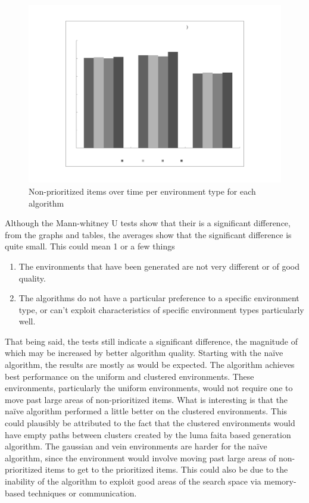 \begin{figure}[!htb]
\centering
\includegraphics[width=\textwidth]{chapters/chapter6/graphs/waste_environment.pdf}
\caption{Non-prioritized items over time per environment type for each algorithm}
\label{environmentgoldplot}
\end{figure}

Although the Mann-whitney U tests show that their is a significant difference, from the graphs and tables, the averages show that the significant difference is quite small. This could mean 1 or a few things
\begin{enumerate}
	\item The environments that have been generated are not very different or of good quality.
	\item The algorithms do not have a particular preference to a specific environment type, or can't exploit characteristics of specific environment types particularly well.
\end{enumerate}

That being said, the tests still indicate a significant difference, the magnitude of which may be increased by better algorithm quality. Starting with the na\"ive algorithm, the results are mostly as would be expected. The algorithm achieves best performance on the uniform and clustered environments. These environments, particularly the uniform environments, would not require one to move past large areas of non-prioritized items. What is interesting is that the na\"ive algorithm performed a little better on the clustered environments. This could plausibly be attributed to the fact that the clustered environments would have empty paths between clusters created by the luma faita based generation algorithm. The gaussian and vein environments are harder for the na\"ive algorithm, since the environment would involve moving past large areas of non-prioritized items to get to the prioritized items. This could also be due to the inability of the algorithm to exploit good areas of the search space via memory-based techniques or communication.

